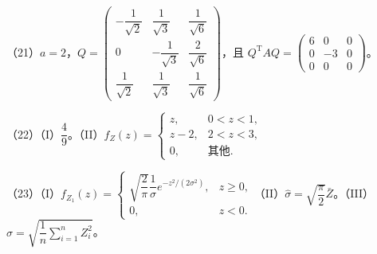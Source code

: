 \documentclass[UTF8,12pt]{ctexart}
\begin{document}
（21）\(\displaystyle a=2\)，\(\displaystyle Q=\begin{pmatrix}-\dfrac{\displaystyle 1}{\displaystyle \sqrt2}&\dfrac{\displaystyle 1}{\displaystyle \sqrt3}&\dfrac{\displaystyle 1}{\displaystyle \sqrt6}\\0&-\dfrac{\displaystyle 1}{\displaystyle \sqrt3}&\dfrac{\displaystyle 2}{\displaystyle \sqrt6}\\\dfrac{\displaystyle 1}{\displaystyle \sqrt2}&\dfrac{\displaystyle 1}{\displaystyle \sqrt3}&\dfrac{\displaystyle 1}{\displaystyle \sqrt6}\end{pmatrix}\)，且 \(\displaystyle Q^{\mathrm T}AQ=\begin{pmatrix}6&0&0\\0&-3&0\\0&0&0\end{pmatrix}\)。


（22）（I）\(\displaystyle \dfrac{\displaystyle 4}{\displaystyle 9}\)。（II）\(\displaystyle f_Z(z)=\begin{cases}z,\allowbreak &0<z<1,\allowbreak \\z-2,\allowbreak &2<z<3,\allowbreak \\0,\allowbreak &\text{其他}.\end{cases}\)


（23）（I）\(\displaystyle f_{Z_1}(z)=\begin{cases}\sqrt{\dfrac{\displaystyle 2}{\displaystyle \pi}}\dfrac{\displaystyle 1}{\displaystyle \sigma} e^{-z^2/(2\sigma^2)},\allowbreak &z\ge0,\allowbreak \\0,\allowbreak &z<0.\end{cases}\)（II）\(\displaystyle \hat\sigma=\sqrt{\dfrac{\displaystyle \pi}{\displaystyle 2}}\bar Z\)。（III）\(\displaystyle \hat\sigma=\sqrt{\dfrac{\displaystyle 1}{\displaystyle n}\displaystyle \sum_{i=1}^nZ_i^2}\)。


\clearpage
\end{document}
